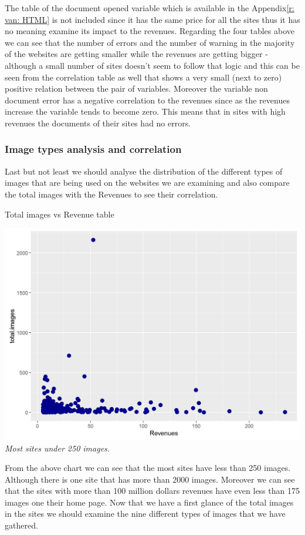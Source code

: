 \documentclass{book}
\begin{document}
The table of the document opened variable which is available in the Appendix\ref{r: van: HTML} is not included since it has the same price for all the sites thus it has no meaning examine its impact to the revenues. Regarding the four tables above we can see that the number of errors and the number of warning in the majority of the websites are getting smaller while the revenues are getting bigger - although a small number of sites doesn't seem to follow that logic and this can be seen from the correlation table as well that shows a very small (next to zero) positive relation between the pair of variables. Moreover the variable non document error has a negative correlation to the revenues since as the revenues increase the variable tends to become zero. This means that in sites with high revenues the documents of their sites had no errors.
\subsubsection{Image types analysis and correlation}
Last but not least we should analyse the distribution of the different types of images that are being used on the websites we are examining and also compare the total images with the Revenues to see their correlation.
\begin{table}[H]
\centering
\caption{Total images vs Revenue table}
\begin{center}
\includegraphics[scale=0.5]{../R/photos/53_timg_rev.png}    \\
\textit{Most sites under 250 images.}
\end{center}
\end{table}
From the above chart we can see that the most sites have less than 250 images. Although there is one site that has more than 2000 images. Moreover we can see that the sites with more than 100 million dollars revenues have even less than 175 images one their home page. Now that we have a first glance of the total images in the sites we should examine the nine different types of images that we have gathered.
\end{document}
